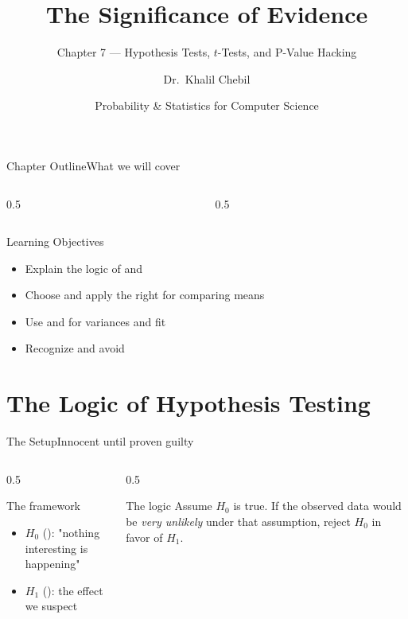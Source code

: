 \documentclass[aspectratio=169,11pt]{beamer}
\title[Ch.\,7 — Significance]{The Significance of Evidence}
\subtitle{Chapter 7 — Hypothesis Tests, $t$-Tests, and P-Value Hacking}
\author{Dr.\ Khalil Chebil}
\date{Probability \& Statistics for Computer Science}
\begin{document}
{
\begin{frame}
  \titlepage
\end{frame}}

\begin{frame}{Chapter Outline}{What we will cover}
  \begin{columns}[T]
    \begin{column}{0.5\textwidth}
      \tableofcontents[sections={1-4}]
    \end{column}
    \begin{column}{0.5\textwidth}
      \tableofcontents[sections={5-6}]
    \end{column}
  \end{columns}
  \vfill
  \begin{block}{Learning Objectives}
    \begin{itemize}
      \item Explain the logic of  and 
      \item Choose and apply the right  for comparing means
      \item Use  and  for variances and fit
      \item Recognize and avoid 
    \end{itemize}
  \end{block}
\end{frame}

\section{The Logic of Hypothesis Testing}

\begin{frame}{The Setup}{Innocent until proven guilty}
  \begin{columns}[T]
    \begin{column}{0.5\textwidth}
      \begin{block}{The framework}
        \small
        \begin{itemize}
          \item $H_0$ (): "nothing interesting is happening"
          \item $H_1$ (): the effect we suspect
        \end{itemize}
      \end{block}
    \end{column}
    \begin{column}{0.5\textwidth}
      \begin{exampleblock}{The logic}
        \small Assume $H_0$ is true. If the observed data would be
        \emph{very unlikely} under that assumption, reject $H_0$ in favor
        of $H_1$.
      \end{exampleblock}
    \end{column}
  \end{columns}
\end{frame}
\end{document}
